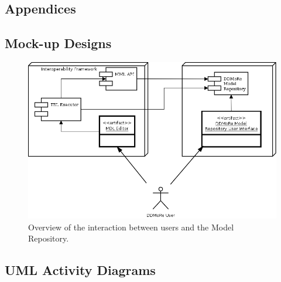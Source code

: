 \begin{landscape}
\section{Appendices}
\label{appendices}
\subsection{Mock-up Designs}
\label{appendix1}

\begin{figure}[htb]
	\centering
	\includegraphics[width=0.75\linewidth]{img/UserInteraction}
	\caption{Overview of the interaction between \ddmore users and the Model Repository.}
	\label{fig:userInteraction1}
\end{figure}
\end{landscape}
\clearpage

\subsection{UML Activity Diagrams}
\label{appendix2}
\clearpage
